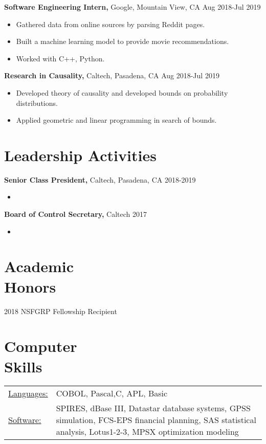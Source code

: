 \documentclass[margin]{res}
\begin{document}
\begin{resume}
{\bf Software Engineering Intern,} Google, Mountain View, CA \hfill Aug 2018-Jul 2019
\begin{itemize} \itemsep -2pt %
\item Gathered data from online sources by parsing Reddit pages.
\item Built a machine learning model to provide movie recommendations.
\item Worked with C++, Python.
\end{itemize}
 
{\bf Research in Causality,} Caltech, Pasadena, CA \hfill Aug 2018-Jul 2019
\begin{itemize} \itemsep -2pt %
\item Developed theory of causality and developed bounds on probability distributions.
\item Applied geometric and linear programming in search of bounds.
\end{itemize}

\section{Leadership   Activities} 
               {\bf Senior Class President,} Caltech, Pasadena, CA    \hfill         2018-2019 
        \begin{itemize} \itemsep -2pt
              \item 
		 \end{itemize}

		{\bf Board of Control Secretary,} Caltech \hfill   2017
                \begin{itemize} \itemsep -2pt
                 \item  
		 \end{itemize}

\section{Academic \\ Honors} 
2018 NSFGRP Fellowship Recipient\\

 

\section{Computer \\ Skills}
   \begin{tabular}{l p{3in}}
    \underline{Languages:} & COBOL, Pascal,C, APL, Basic \\

     \underline{Software:} &  SPIRES, dBase III, Datastar database 
                        systems, GPSS simulation, FCS-EPS financial 
                        planning, SAS statistical analysis, 
                        Lotus1-2-3, MPSX optimization modeling 
 \end{tabular}

\end{resume} 
\end{document}
